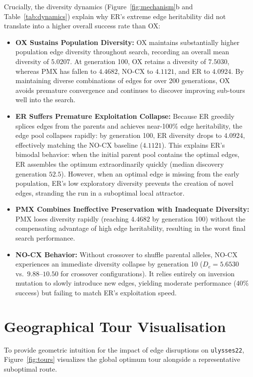 \documentclass[10pt,a4paper]{article}
\begin{document}
Crucially, the diversity dynamics (Figure~\ref{fig:mechanism}b and Table~\ref{tab:dynamics}) explain why ER's extreme edge heritability did not translate into a higher overall success rate than OX:
\begin{itemize}
    \item \textbf{OX Sustains Population Diversity:} OX maintains substantially higher population edge diversity throughout search, recording an overall mean diversity of $5.0207$. At generation 100, OX retains a diversity of $7.5030$, whereas PMX has fallen to $4.4682$, NO-CX to $4.1121$, and ER to $4.0924$. By maintaining diverse combinations of edges for over 200 generations, OX avoids premature convergence and continues to discover improving sub-tours well into the search.
    \item \textbf{ER Suffers Premature Exploitation Collapse:} Because ER greedily splices edges from the parents and achieves near-100\% edge heritability, the edge pool collapses rapidly: by generation 100, ER diversity drops to $4.0924$, effectively matching the NO-CX baseline ($4.1121$). This explains ER's bimodal behavior: when the initial parent pool contains the optimal edges, ER assembles the optimum extraordinarily quickly (median discovery generation $52.5$). However, when an optimal edge is missing from the early population, ER's low exploratory diversity prevents the creation of novel edges, stranding the run in a suboptimal local attractor.
    \item \textbf{PMX Combines Ineffective Preservation with Inadequate Diversity:} PMX loses diversity rapidly (reaching $4.4682$ by generation 100) without the compensating advantage of high edge heritability, resulting in the worst final search performance.
    \item \textbf{NO-CX Behavior:} Without crossover to shuffle parental alleles, NO-CX experiences an immediate diversity collapse by generation 10 ($D_e = 5.6530$ vs.~$9.88$--$10.50$ for crossover configurations). It relies entirely on inversion mutation to slowly introduce new edges, yielding moderate performance ($40\%$ success) but failing to match ER's exploitation speed.
\end{itemize}

\section{Geographical Tour Visualisation}
\label{sec:tours}

To provide geometric intuition for the impact of edge disruptions on \texttt{ulysses22}, Figure~\ref{fig:tours} visualizes the global optimum tour alongside a representative suboptimal route.
\end{document}
